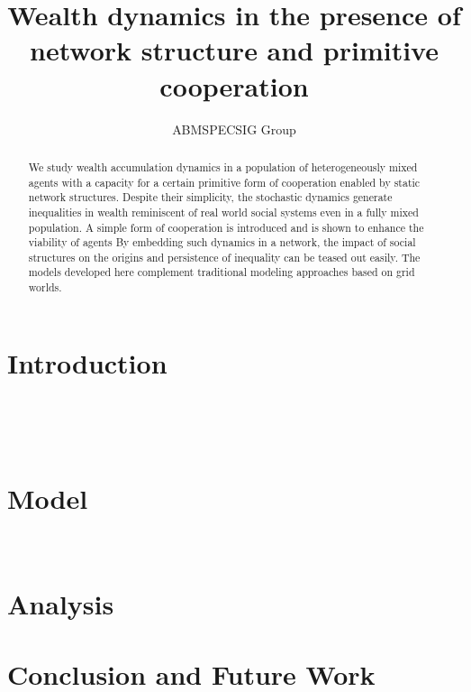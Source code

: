\documentclass{article}
\author{ABMSPECSIG Group}
\title{Wealth dynamics in the presence of network structure and primitive cooperation}
\begin{document}
\maketitle
\begin{abstract}
We study wealth accumulation dynamics in a population of heterogeneously mixed agents with a capacity for a certain primitive form of cooperation enabled by static network structures. Despite their simplicity, the stochastic dynamics generate inequalities in wealth reminiscent of real world social systems even in a fully mixed population. A simple form of cooperation is introduced and is shown to enhance the viability of agents By embedding such dynamics in a network, the impact of social structures on the origins and persistence of inequality can be teased out easily. The models developed here complement traditional modeling approaches based on grid worlds.   

\end{abstract}
\section{Introduction}

~\cite{ch1as_hdbk,hedstrom2011oxford,martin_lee}

~\cite{ch2as_hdbk,ch11as_hdbk,granovetter2005,hedstrom2018}

\section{Model}
~\cite{redner2001guide}

\section{Analysis}

\section{Conclusion and Future Work}

\end{document}
